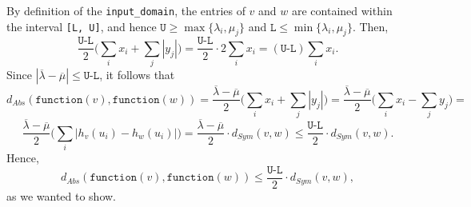 \documentclass[11pt,a4paper]{article}
\theoremstyle{definition}
\newcommand{\function}{\texttt{function}}
\begin{document}
By definition of the \texttt{input\_domain}, the entries of $v$ and $w$ are contained within the interval \texttt{[L, U]}, and hence $\texttt{U} \geq \max\{\lambda_i, \mu_j\}$ and $\texttt{L} \leq \min\{\lambda_i, \mu_j\}$. Then,
\[
    \dfrac{\texttt{U-L}}{2} \Big(\sum_i x_i + \sum_j |y_j|\Big) = \dfrac{\texttt{U-L}}{2} \cdot 2 \sum_i x_i = (\texttt{U-L}) \sum_i x_i.
\]
Since $|\overline{\lambda} - \overline{\mu}| \leq \texttt{U-L}$, it follows that
\[
    d_{Abs}(\function(v), \function(w)) = \dfrac{\overline{\lambda}-\overline{\mu}}{2}\Big(\sum_i x_i + \sum_j |y_j|\Big) = \dfrac{\overline{\lambda}-\overline{\mu}}{2}\Big(\sum_i x_i - \sum_j y_j\Big) =
\]
\[
    \dfrac{\overline{\lambda}-\overline{\mu}}{2} \Big(\sum_i |h_v(u_i) - h_w(u_i)| \Big) = \dfrac{\overline{\lambda}-\overline{\mu}}{2} \cdot d_{Sym}(v, w) \leq \dfrac{\texttt{U-L}}{2} \cdot d_{Sym}(v, w).
\]
Hence,
\[
    d_{Abs}(\function(v), \function(w)) \leq \dfrac{\texttt{U-L}}{2} \cdot d_{Sym}(v, w),
\]
as we wanted to show.
\end{document}
